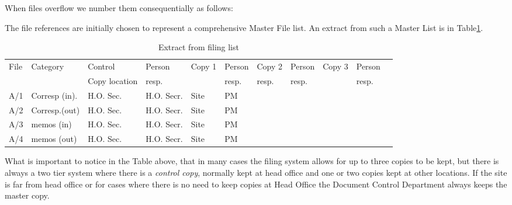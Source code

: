 When files overflow we number them consequentially as follows:

\begin{center}
\end{center}

The file references are initially chosen to represent a comprehensive Master File list. An extract from such a Master List is in Table\ref{masterlist}.


\begin{fullwidth}
\begin{table}[htb]
\vspace{0.5cm}

\small
\hskip-10pt\begin{tabular}{|l|l|l|l||l|l||l|l||l|l|l|}
\hline
File &Category        &Control              & Person       &Copy 1  &Person        &Copy 2        &Person      &Copy 3 &Person\\
     &                &Copy location        & resp. &        &resp.   &resp.   &resp. &      &resp.\\
\hline
A/1    & Corresp (in).       & H.O. Sec.           & H.O. Secr. & Site & PM           &              &            &      & \\
A/2    & Corresp.(out)       & H.O. Sec.           & H.O. Secr. & Site & PM           &              &            &      & \\
A/3    & memos (in)          & H.O. Sec.           & H.O. Secr. & Site & PM           &              &            &      & \\
A/4    & memos (out)         & H.O. Sec.           & H.O. Secr. & Site & PM           &              &            &      & \\
\hline
\end{tabular} 	
\caption{Extract from filing list}
\label{masterlist}
\end{table}
\end{fullwidth}

What is important to notice in the Table above, that in many cases the filing system allows for up to three copies to be kept, but there is always a two tier system where there is a \textit{control copy}, normally kept at head office and one or two copies kept at other locations. If the site is far from head office or for cases where there is no need to keep copies at Head Office the Document Control Department always keeps the master copy.

